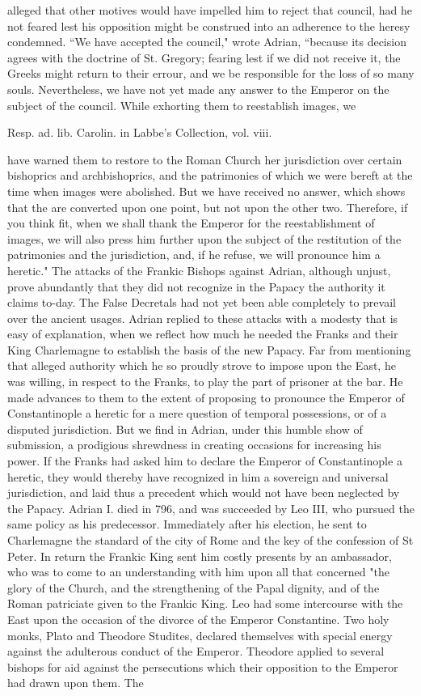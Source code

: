 alleged that other motives would have impelled him to reject that council, had he not feared lest his opposition might be construed into an adherence to the heresy condemned. “We have accepted the council," wrote Adrian, “because its decision agrees with the doctrine of St. Gregory; fearing lest if we did not receive it, the Greeks might return to their errour, and we be responsible for the loss of so many souls. Nevertheless, we have not yet made any answer to the Emperor on the subject of the council. While exhorting them to reestablish images, we

Resp. ad. lib. Carolin. in Labbe’s Collection, vol. viii.

have warned them to restore to the Roman Church her jurisdiction over certain bishoprics and archbishoprics, and the patrimonies of which we were bereft at the time when images were abolished. But we have received no answer, which shows that the are converted upon one point, but not upon the other two. Therefore, if you think fit, when we shall thank the Emperor for the reestablishment of images, we will also press him further upon the subject of the restitution of the patrimonies and the jurisdiction, and, if he refuse, we will pronounce him a heretic." The attacks of the Frankic Bishops against Adrian, although unjust, prove abundantly that they did not recognize in the Papacy the authority it claims to-day. The False Decretals had not yet been able completely to prevail over the ancient usages. Adrian replied to these attacks with a modesty that is easy of explanation, when we reflect how much he needed the Franks and their King Charlemagne to establish the basis of the new Papacy. Far from mentioning that alleged authority which he so proudly strove to impose upon the East, he was willing, in respect to the Franks, to play the part of prisoner at the bar. He made advances to them to the extent of proposing to pronounce the Emperor of Constantinople a heretic for a mere question of temporal possessions, or of a disputed jurisdiction. But we find in Adrian, under this humble show of submission, a prodigious shrewdness in creating occasions for increasing his power. If the Franks had asked him to declare the Emperor of Constantinople a heretic, they would thereby have recognized in him a sovereign and universal jurisdiction, and laid thus a precedent which would not have been neglected by the Papacy. Adrian I. died in 796, and was succeeded by Leo III, who pursued the same policy as his predecessor. Immediately after his election, he sent to Charlemagne the standard of the city of Rome and the key of the confession of St Peter. In return the Frankic King sent him costly presents by an ambassador, who was to come to an understanding with him upon all that concerned "the glory of the Church, and the strengthening of the Papal dignity, and of the Roman patriciate given to the Frankic King. Leo had some intercourse with the East upon the occasion of the divorce of the Emperor Constantine. Two holy monks, Plato and Theodore Studites, declared themselves with special energy against the adulterous conduct of the Emperor. Theodore applied to several bishops for aid against the persecutions which their opposition to the Emperor had drawn upon them. The 